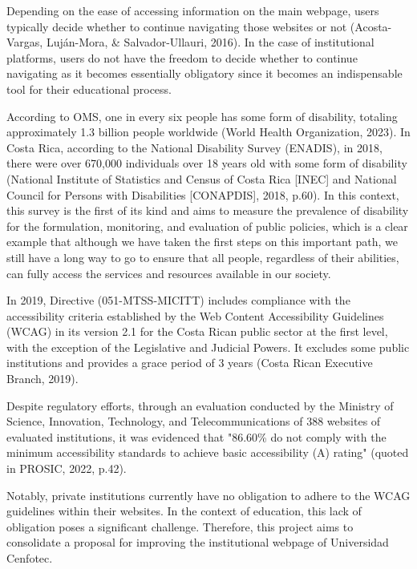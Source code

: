 \documentclass{IEEEtran}
\begin{document}
Depending on the ease of accessing information on the main webpage, users typically decide whether to continue navigating those websites or not \cite{AcostaVargas2016}(Acosta-Vargas, Luján-Mora, \& Salvador-Ullauri, 2016). In the case of institutional platforms, users do not have the freedom to decide whether to continue navigating as it becomes essentially obligatory since it becomes an indispensable tool for their educational process.

According to OMS, one in every six people has some form of disability, totaling approximately 1.3 billion people worldwide \cite{Organizacion2023}(World Health Organization, 2023). In Costa Rica, according to the National Disability Survey (ENADIS), in 2018, there were over 670,000 individuals over 18 years old with some form of disability \cite{Instituto2018}(National Institute of Statistics and Census of Costa Rica [INEC] and National Council for Persons with Disabilities [CONAPDIS], 2018, p.60). In this context, this survey is the first of its kind and aims to measure the prevalence of disability for the formulation, monitoring, and evaluation of public policies, which is a clear example that although we have taken the first steps on this important path, we still have a long way to go to ensure that all people, regardless of their abilities, can fully access the services and resources available in our society.

In 2019, Directive (051-MTSS-MICITT) includes compliance with the accessibility criteria established by the Web Content Accessibility Guidelines (WCAG) in its version 2.1 for the Costa Rican public sector at the first level, with the exception of the Legislative and Judicial Powers. It excludes some public institutions and provides a grace period of 3 years \cite{SCOM}(Costa Rican Executive Branch, 2019).

Despite regulatory efforts, through an evaluation conducted by the Ministry of Science, Innovation, Technology, and Telecommunications of 388 websites of evaluated institutions, it was evidenced that "86.60\% do not comply with the minimum accessibility standards to achieve basic accessibility (A) rating" (quoted in PROSIC, 2022, p.42).

Notably, private institutions currently have no obligation to adhere to the WCAG guidelines within their websites. In the context of education, this lack of obligation poses a significant challenge. Therefore, this project aims to consolidate a proposal for improving the institutional webpage of Universidad Cenfotec. 
\end{document}
